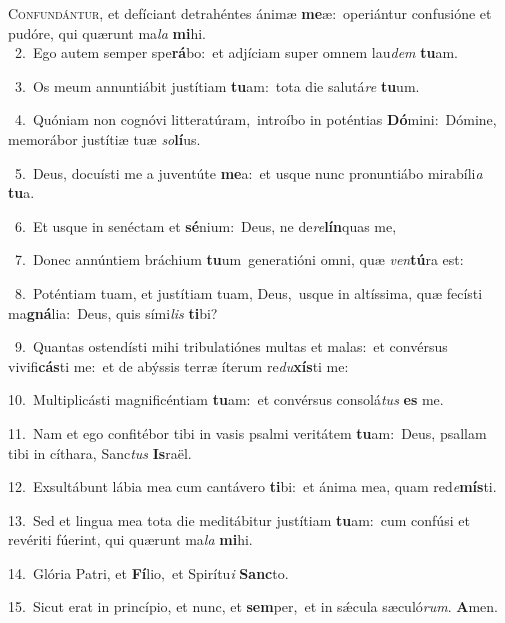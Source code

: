 \lettrine{\initial\textcolor{\initialcolor}{C}}{onfundántur,} et defíciant detrahéntes ánimæ \textbf{me}\-æ:~\star operiántur confusióne et pudóre, qui quærunt ma\textit{la} \textbf{mi}\-hi.\\
{\numbfont\textcolor{\numbcolor}{~2.}}~Ego autem semper spe\-\textbf{rá}\-bo:~\star et adjíciam super omnem lau\textit{dem} \textbf{tu}\-am.\par
{\numbfont\textcolor{\numbcolor}{~3.}}~Os meum annuntiábit justítiam \textbf{tu}\-am:~\star tota die salutá\textit{re} \textbf{tu}\-um.\par
{\numbfont\textcolor{\numbcolor}{~4.}}~Quóniam non cognóvi litteratúram,~\dagger introíbo in poténtias \textbf{Dó}\-mini:~\star Dómine, memorábor justítiæ tuæ \textit{so}\-\textbf{lí}us.\par
{\numbfont\textcolor{\numbcolor}{~5.}}~Deus, docuísti me a juventúte \textbf{me}\-a:~\star et usque nunc pronuntiábo mirabíli\textit{a} \textbf{tu}\-a.\par
{\numbfont\textcolor{\numbcolor}{~6.}}~Et usque in senéctam et \textbf{sé}\-nium:~\star Deus, ne de\-\textit{re}\-\textbf{lín}quas me,\par
{\numbfont\textcolor{\numbcolor}{~7.}}~Donec annúntiem bráchium \textbf{tu}\-um~\star generatióni omni, quæ \textit{ven}\-\textbf{tú}ra est:\par
{\numbfont\textcolor{\numbcolor}{~8.}}~Poténtiam tuam, et justítiam tuam, Deus,~\dagger usque in altíssima, quæ fecísti ma\-\textbf{gná}\-lia:~\star Deus, quis sími\textit{lis} \textbf{ti}\-bi?\par
{\numbfont\textcolor{\numbcolor}{~9.}}~Quantas ostendísti mihi tribulatiónes multas et malas:~\dagger et convérsus vivifi\-\textbf{cás}\-ti me:~\star et de abýssis terræ íterum re\-\textit{du}\-\textbf{xís}ti me:\par
{\numbfont\textcolor{\numbcolor}{10.}}~Multiplicásti magnificéntiam \textbf{tu}\-am:~\star et convérsus consolá\textit{tus} \textbf{es} me.\par
{\numbfont\textcolor{\numbcolor}{11.}}~Nam et ego confitébor tibi in vasis psalmi veritátem \textbf{tu}\-am:~\star Deus, psallam tibi in cíthara, Sanc\textit{tus} \textbf{Is}\-raël.\par
{\numbfont\textcolor{\numbcolor}{12.}}~Exsultábunt lábia mea cum cantávero \textbf{ti}\-bi:~\star et ánima mea, quam red\-\textit{e}\-\textbf{mís}ti.\par
{\numbfont\textcolor{\numbcolor}{13.}}~Sed et lingua mea tota die meditábitur justítiam \textbf{tu}\-am:~\star cum confúsi et revériti fúerint, qui quærunt ma\textit{la} \textbf{mi}\-hi.\par
{\numbfont\textcolor{\numbcolor}{14.}}~Glória Patri, et \textbf{Fí}\-lio,~\star et Spirítu\textit{i} \textbf{Sanc}\-to.\par
{\numbfont\textcolor{\numbcolor}{15.}}~Sicut erat in princípio, et nunc, et \textbf{sem}\-per,~\star et in sǽcula sæculó\-\textit{rum}\-. \textbf{A}\-men.\par
